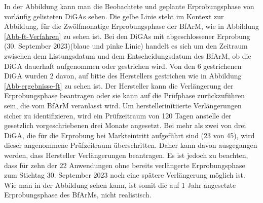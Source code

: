 \documentclass{article}
\begin{document}
			In der Abbildung kann man die Beobachtete und geplante Erprobungsphase von vorläufig gelisteten DiGAs sehen. Die gelbe Linie steht im Kontext zur Abbildung, für die  Zwölfmonatige Erprobungsphase der BfArM, wie in Abbildung \ref{Abb-ft-Verfahren} zu sehen ist. Bei den DiGAs mit abgeschlossener Erprobung (30. September 2023)(blaue und pinke Linie) handelt es sich um den Zeitraum zwischen dem Listungsdatum und dem Entscheidungsdatum des BfArM, ob die DiGA dauerhaft aufgenommen oder gestrichen wird\cite[vgl. S.10]{TK-Report-2}. Von den 6 gestrichenen DiGA wurden 2 davon, auf bitte des Herstellers gestrichen wie in Abbildung \ref{Abb-ergebnisse-ft} zu sehen ist. Der Hersteller kann die Verlängerung der Erprobungsphase beantragen oder sie kann auf die Prüfphase zurückzuführen sein, die vom BfArM veranlasst wird. Um herstellerinitiierte Verlängerungen sicher zu identifizieren, wird ein Prüfzeitraum von 120 Tagen anstelle der gesetzlich vorgeschriebenen drei Monate angesetzt. Bei mehr als zwei von drei DiGA, die für die Erprobung bei Markteintritt aufgeführt sind (23 von 45), wird dieser angenommene Prüfzeitraum überschritten. Daher kann davon ausgegangen werden, dass Hersteller Verlängerungen beantragen. Es ist jedoch zu beachten, dass für zehn der 22 Anwendungen ohne bereits verlängerte Erprobungsphase zum Stichtag 30. September 2023 noch eine spätere Verlängerung möglich ist.\cite[vgl S. 10]{TK-Report-2} Wie man in der Abbildung sehen kann, ist somit die auf 1 Jahr angesetzte Erprobungsphase des BfArMs, nicht realistisch.
\end{document}
